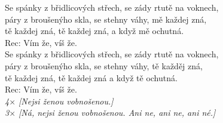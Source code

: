 
Se spánky z břidlicových střech, \hspace{1cm} se zády rtutě na voknech, \\
páry z broušenýho skla, se stehny váhy, mě každej zná, \\
tě každej zná, tě každej zná, \hspace{1,5cm} a když mě ochutná.\\

Rec: Vím že, víš že.\\

Se spánky z břidlicových střech, se zády rtutě na voknech,\\
páry z broušenýho skla, se stehny váhy, tě každěj zná,\\
tě každej zná, tě každej zná a když tě ochutná.\\

Rec: Vím že, víš že.\\

\emph{4$\times$ [Nejsi ženou vobnošenou.]}\\

\emph{3$\times$ [Ná, nejsi ženou vobnošenou. Ani ne, ani ne, ani né.]}

\newpage
